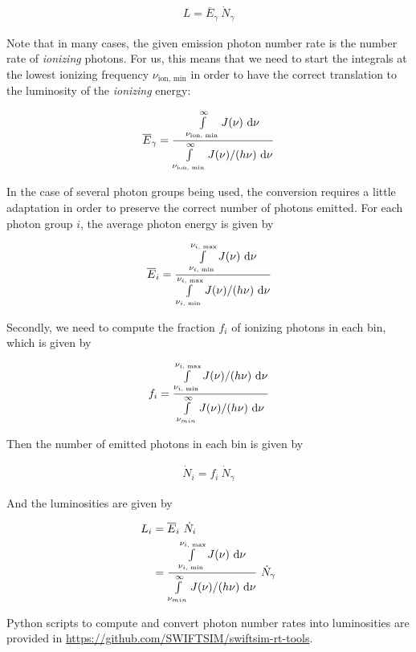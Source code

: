 \begin{align}
	L = \overline{E}_\gamma \ \dot{N}_{\gamma}
\end{align}

Note that in many cases, the given emission photon number rate is the number rate of \emph{ionizing} photons. For us, this means that we need to start the integrals at the lowest ionizing frequency $\nu_{\text{ion, min}}$ in order to have the correct translation to the luminosity of the \emph{ionizing} energy:


\begin{align}
	\overline{E}_\gamma = \frac{\int\limits_{\nu_{\text{ion, min}}}^\infty J(\nu) \ \mathrm{d} \nu }{\int\limits_{\nu_{\text{ion, min}}}^\infty J(\nu) / (h \nu) \ \mathrm{d} \nu}
\end{align}


In the case of several photon groups being used, the conversion requires a little adaptation in order to preserve the correct number of photons emitted. For each photon group $i$, the average photon energy is given by

\begin{align}
	\overline{E}_i = \frac{\int\limits_{\nu_{i \text{, min}}}^{\nu_{i \text{, max}}} J(\nu) \ \mathrm{d} \nu }{\int\limits_{\nu_{i \text{, min}}}^{\nu_{i \text{, max}}} J(\nu) / (h \nu) \ \mathrm{d} \nu}
\end{align}


Secondly, we need to compute the fraction $f_i$ of ionizing photons in each bin, which is given by

\begin{align}
	f_i = \frac{\int\limits_{\nu_{i \text{, min}}}^{\nu_{i \text{, max}}} J(\nu) / (h \nu)  \ \mathrm{d} \nu }{\int\limits_{\nu_{min}}^{\infty} J(\nu) / (h \nu) \ \mathrm{d} \nu}
\end{align}

Then the number of emitted photons in each bin is given by

\begin{align}
\dot{N}_i = f_i\ \dot{N}_\gamma
\end{align}

And the luminosities are given by

\begin{align}
	L_i &= \overline{E}_i \ \dot{N}_i \\
			&= \frac{\int\limits_{\nu_{i \text{, min}}}^{\nu_{i \text{, max}}} J(\nu) \ \mathrm{d} \nu }{\int\limits_{\nu_{min}}^{\infty} J(\nu) / (h \nu) \ \mathrm{d} \nu} \ \dot{N}_\gamma
\end{align}



Python scripts to compute and convert photon number rates into luminosities are provided in
\url{https://github.com/SWIFTSIM/swiftsim-rt-tools}.







